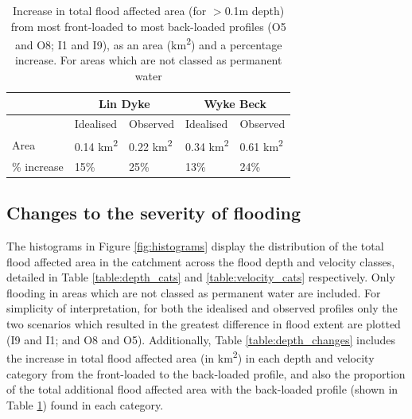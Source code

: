 \documentclass[APA,Times2COL]{WileyNJDv5}
\begin{document}
\begingroup
\renewcommand{\arraystretch}{1.3} %
\begin{table}[h!]
\caption{Increase in total flood affected area (for $>$0.1m depth) from most front-loaded to most back-loaded profiles (O5 and O8; I1 and I9), as an area (km\textsuperscript{2}) and a percentage increase. For areas which are not classed as permanent water} \label{tab:total_flooded_area_changes} 
\begin{tabular}{lllll}
\hline
 & \multicolumn{2}{c}{\textbf{Lin Dyke}}  & \multicolumn{2}{c}{\textbf{Wyke Beck }} \\
 \hline
 & Idealised     & Observed      & Idealised     & Observed      \\
\hline
Area & 0.14 km\textsuperscript{2} & 0.22 km\textsuperscript{2}  & 0.34 km\textsuperscript{2}  & 0.61 km\textsuperscript{2} \\
\% increase & 15\% & 25\%  & 13\%  & 24\% \\
\hline
\end{tabular}
\end{table}
\endgroup

\subsection{Changes to the severity of flooding}\label{subsec:model}
The histograms in Figure \ref{fig:histograms} display the distribution of the total flood affected area in the catchment across the flood depth and velocity classes, detailed in Table \ref{table:depth_cats} and \ref{table:velocity_cats} respectively. Only flooding in areas which are not classed as permanent water are included. For simplicity of interpretation, for both the idealised and observed profiles only the two scenarios which resulted in the greatest difference in flood extent are plotted (I9 and I1; and O8 and O5). Additionally, Table \ref{table:depth_changes} includes the increase in total flood affected area (in km\textsuperscript{2}) in each depth and velocity category from the front-loaded to the back-loaded profile, and also the proportion of the total additional flood affected area with the back-loaded profile (shown in Table \ref{tab:total_flooded_area_changes}) found in each category.  

\end{document}
